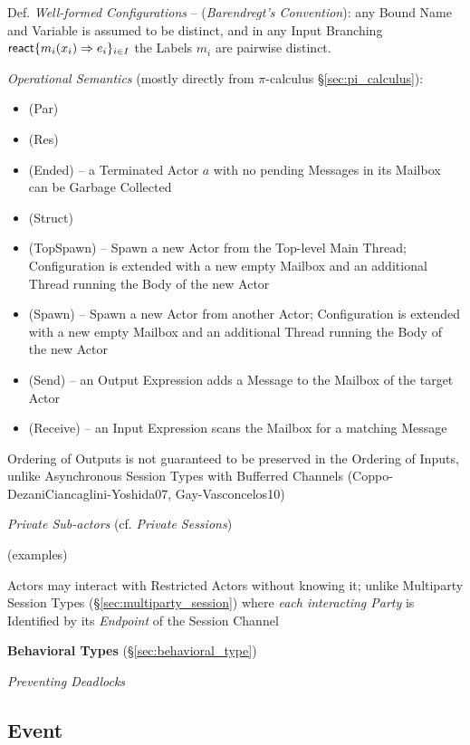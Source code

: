 Def. \emph{Well-formed Configurations} -- (\emph{Barendregt's
  Convention}): any Bound Name and Variable is assumed to be distinct,
and in any Input Branching $\mathsf{react}\{m_i(x_i) \Rightarrow e_i\}_{i \in
  I}$ the Labels $m_i$ are pairwise distinct.

\emph{Operational Semantics} (mostly directly from $\pi$-calculus
\S\ref{sec:pi_calculus}):
\begin{itemize}
  \item (Par)
  \item (Res)
  \item (Ended) -- a Terminated Actor $a$ with no pending Messages in
    its Mailbox can be Garbage Collected
  \item (Struct)
  \item (TopSpawn) -- Spawn a new Actor from the Top-level Main
    Thread; Configuration is extended with a new empty Mailbox and an
    additional Thread running the Body of the new Actor
  \item (Spawn) -- Spawn a new Actor from another Actor; Configuration
    is extended with a new empty Mailbox and an additional Thread
    running the Body of the new Actor
  \item (Send) -- an Output Expression adds a Message to the Mailbox
    of the target Actor
  \item (Receive) -- an Input Expression scans the Mailbox for a
    matching Message
\end{itemize}

Ordering of Outputs is not guaranteed to be preserved in the Ordering
of Inputs, unlike Asynchronous Session Types with Bufferred Channels
(Coppo-DezaniCiancaglini-Yoshida07, Gay-Vasconcelos10)

\emph{Private Sub-actors} (cf. \emph{Private Sessions}) %

(examples) %

Actors may interact with Restricted Actors without knowing it; unlike
Multiparty Session Types (\S\ref{sec:multiparty_session}) where
\emph{each interacting Party} is Identified by its \emph{Endpoint} of
the Session Channel


\textbf{Behavioral Types} (\S\ref{sec:behavioral_type})

\emph{Preventing Deadlocks}


\endgroup



\subsection{Event}\label{sec:event}

